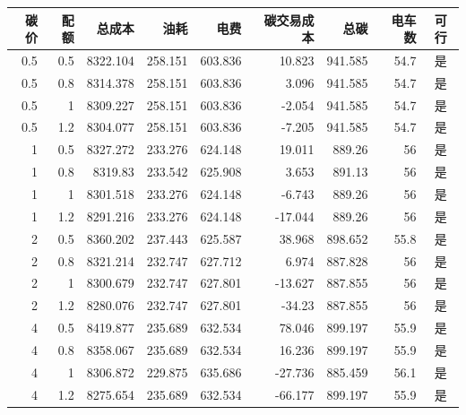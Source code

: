 \begin{tabular}{@{}rrrrrrrrc@{}}
\toprule
碳价 & 配额 & 总成本 & 油耗 & 电费 & 碳交易成本 & 总碳 & 电车数 & 可行\\
\midrule
0.5 & 0.5 & 8322.104 & 258.151 & 603.836 & 10.823 & 941.585 & 54.7 & 是\\
0.5 & 0.8 & 8314.378 & 258.151 & 603.836 & 3.096 & 941.585 & 54.7 & 是\\
0.5 & 1 & 8309.227 & 258.151 & 603.836 & -2.054 & 941.585 & 54.7 & 是\\
0.5 & 1.2 & 8304.077 & 258.151 & 603.836 & -7.205 & 941.585 & 54.7 & 是\\
1 & 0.5 & 8327.272 & 233.276 & 624.148 & 19.011 & 889.26 & 56 & 是\\
1 & 0.8 & 8319.83 & 233.542 & 625.908 & 3.653 & 891.13 & 56 & 是\\
1 & 1 & 8301.518 & 233.276 & 624.148 & -6.743 & 889.26 & 56 & 是\\
1 & 1.2 & 8291.216 & 233.276 & 624.148 & -17.044 & 889.26 & 56 & 是\\
2 & 0.5 & 8360.202 & 237.443 & 625.587 & 38.968 & 898.652 & 55.8 & 是\\
2 & 0.8 & 8321.214 & 232.747 & 627.712 & 6.974 & 887.828 & 56 & 是\\
2 & 1 & 8300.679 & 232.747 & 627.801 & -13.627 & 887.855 & 56 & 是\\
2 & 1.2 & 8280.076 & 232.747 & 627.801 & -34.23 & 887.855 & 56 & 是\\
4 & 0.5 & 8419.877 & 235.689 & 632.534 & 78.046 & 899.197 & 55.9 & 是\\
4 & 0.8 & 8358.067 & 235.689 & 632.534 & 16.236 & 899.197 & 55.9 & 是\\
4 & 1 & 8306.872 & 229.875 & 635.686 & -27.736 & 885.459 & 56.1 & 是\\
4 & 1.2 & 8275.654 & 235.689 & 632.534 & -66.177 & 899.197 & 55.9 & 是\\
\bottomrule
\end{tabular}
